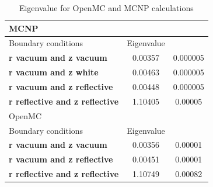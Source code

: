 \begin{table}
  \centering
  \begin{tabular}{|lcc|}
    \hline \hline
    MCNP &  & \\
    \hline
    Boundary conditions & Eigenvalue & \\
    \hline
    \textbf{r vacuum and z vacuum}         & 0.00357 & 0.000005 \\
    \textbf{r vacuum and z white}	         & 0.00463 & 0.000005 \\
    \textbf{r vacuum  and z reflective}    & 0.00448 & 0.000005 \\
    \textbf{r reflective and z reflective} & 1.10405 & 0.00005  \\
    \hline \hline
    OpenMC & & \\
    \hline
    Boundary conditions & Eigenvalue & \\
    \hline
    \textbf{r vacuum and z vacuum}         & 0.00356 & 0.00001 \\
    \textbf{r vacuum  and z reflective}    & 0.00451 & 0.00001 \\
    \textbf{r reflective and z reflective} & 1.10749 & 0.00082 \\
    \hline \hline
  \end{tabular}
  \caption{Eigenvalue for OpenMC and MCNP calculations}
  \label{tab:eigen}
\end{table}
